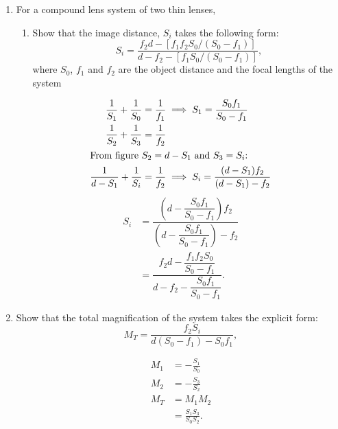 \documentclass{zc-ust-hw}
\begin{document}
\maketitle

\begin{enumerate}
  \item For a compound lens system of two thin lenses,
    \begin{enumerate}
      \item Show that the image distance, $S_i$ takes the following form:
        \[
          S_i=\frac{f_{2}d-[f_{1}f_{2}S_{0}/(S_{0}-f_{1})]}{d-f_{2}-[f_{1}S_{0} /(S_{0}-f_{1})]}
        ,\] 
        where $S_0$, $f_1$ and $f_2$ are the object distance and the focal lengths of the system
    \end{enumerate}

    \begin{sol}
      \begin{align}
        \frac{1}{S_{1}} + \frac{1}{S_{0}} &= \frac{1}{f_{1}} 
        \implies
        S_{1} = \frac{S_{0}f_{1}}{S_{0}-f_{1}} \\
        \frac{1}{S_{2}} + \frac{1}{S_{3}} &= \frac{1}{f_{2}} \\
        \intertext{From figure \( S_{2}=d-S_{1} \) and \( S_{3}=S_i \):}
        \frac{1}{d-S_{1}} + \frac{1}{S_i} &= \frac{1}{f_{2}}
        \implies
        S_{i} = \frac{(d-S_{1})f_{2}}{(d-S_{1})-f_{2}} \\
      \end{align}
      \begin{align}
        S_{i} &= \dfrac{(d-\dfrac{S_{0}f_{1}}{S_{0}-f_{1}})f_{2}}{(d-\dfrac{S_{0}f_{1}}{S_{0}-f_{1}})-f_{2}} \\
              &= \dfrac{f_{2}d-\dfrac{f_{1}f_{2}S_{0}}{S_{0}-f_{1}}}{d-f_{2}-\dfrac{S_{0}f_{1}}{S_{0}-f_{1}}}
      .\end{align}
    \end{sol}
  \item Show that the total magnification of the system takes the explicit
    form: 
    \[
      M_T=\frac{f_{2}S_i}{d(S_{0}-f_{1})-S_{0}f_{1}}
    ,\] 
    \begin{sol}
      \begin{align}
        M_{1} &= -\frac{S_{1}}{S_{0}} \\
        M_{2} &= -\frac{S_{3}}{S_{2}} \\
        M_T &= M_{1} M_{2} \\
            &= \frac{S_{1}S_{3}}{S_{0}S_{2}}
      .\end{align}

\end{sol}
\end{enumerate}
\end{document}
